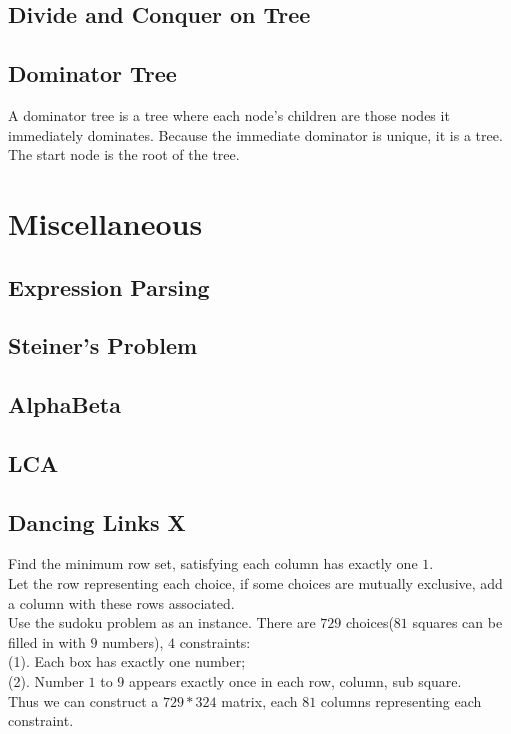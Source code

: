 \documentclass[10pt]{article}
\begin{document}
{\subsection{Divide and Conquer on Tree}

\subsection{Dominator Tree}
\noindent
A dominator tree is a tree where each node's children are those nodes it immediately dominates. Because the immediate dominator is unique, it is a tree. The start node is the root of the tree.

\section{Miscellaneous}
% 
\subsection{Expression Parsing}

\subsection{Steiner's Problem}

\subsection{AlphaBeta}

\subsection{LCA}

\subsection{Dancing Links X}

Find the minimum row set, satisfying each column has exactly one $1$. \\
Let the row representing each choice, if some choices are mutually exclusive, add a column with these rows associated. \\
Use the sudoku problem as an instance. There are $729$ choices($81$ squares can be filled in with $9$ numbers), $4$ constraints:\\
(1). Each box has exactly one number; \\
(2). Number $1$ to $9$ appears exactly once in each row, column, sub square. \\
Thus we can construct a $729*324$ matrix, each $81$ columns representing each constraint.\\
}
\end{document}
